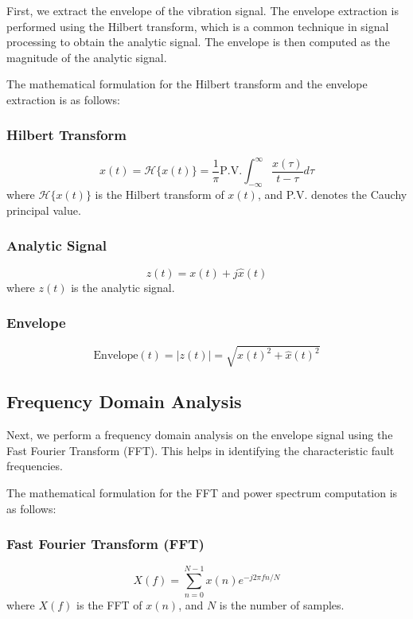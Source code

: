 \documentclass[conference]{IEEEtran}
\begin{document}
First, we extract the envelope of the vibration signal. The envelope extraction is performed using the Hilbert transform, which is a common technique in signal processing to obtain the analytic signal. The envelope is then computed as the magnitude of the analytic signal.

The mathematical formulation for the Hilbert transform and the envelope extraction is as follows:

\subsubsection{Hilbert Transform}
\begin{equation}
\hat{x}(t) = \mathcal{H}\{x(t)\} = \frac{1}{\pi} \text{P.V.} \int_{-\infty}^{\infty} \frac{x(\tau)}{t - \tau} d\tau
\end{equation}
where \(\mathcal{H}\{x(t)\}\) is the Hilbert transform of \(x(t)\), and P.V. denotes the Cauchy principal value.

\subsubsection{Analytic Signal}
\begin{equation}
z(t) = x(t) + j\hat{x}(t)
\end{equation}
where \(z(t)\) is the analytic signal.

\subsubsection{Envelope}
\begin{equation}
\text{Envelope}(t) = |z(t)| = \sqrt{x(t)^2 + \hat{x}(t)^2}
\end{equation}

\subsection{Frequency Domain Analysis}

Next, we perform a frequency domain analysis on the envelope signal using the Fast Fourier Transform (FFT). This helps in identifying the characteristic fault frequencies.

The mathematical formulation for the FFT and power spectrum computation is as follows:

\subsubsection{Fast Fourier Transform (FFT)}
\begin{equation}
X(f) = \sum_{n=0}^{N-1} x(n) e^{-j2\pi fn/N}
\end{equation}
where \(X(f)\) is the FFT of \(x(n)\), and \(N\) is the number of samples.
\end{document}
